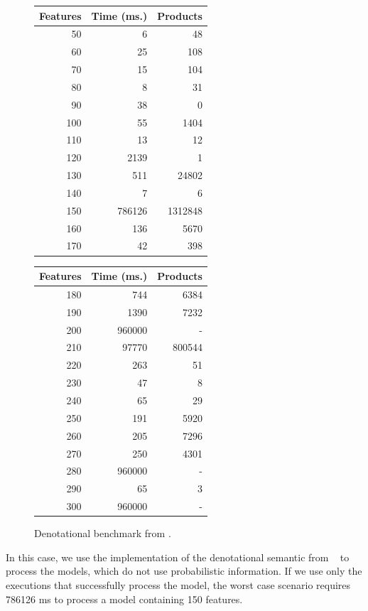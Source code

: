 \begin{figure}[t]
	\centering
	\begin{minipage}{0.4\hsize}
	\begin{tabular}{|rrr|}
			\hline
		Features&       Time (ms.)&    Products\\
			\hline
		50 & 6 & 48 \\
		60 & 25 & 108 \\
		70 & 15 & 104 \\
		80 & 8 & 31 \\
		90 & 38 & 0 \\
		100 & 55 & 1404 \\
		110 & 13 & 12 \\
		120 & 2139 & 1 \\
		130 & 511 & 24802 \\
		140 & 7 & 6 \\
		150 & 786126 & 1312848 \\
		160 & 136 & 5670 \\
		170 & 42 & 398 \\
		\hline
	\end{tabular}
	\end{minipage}
	\begin{minipage}{0.4\hsize}
	\begin{tabular}{|rrr|}
		\hline
		Features&       Time (ms.)&    Products\\
			\hline		
180 & 744 & 6384 \\
190 & 1390 & 7232 \\
200 & 960000 & - \\
210 & 97770 & 800544 \\
220 & 263 & 51 \\
230 & 47 & 8 \\
240 & 65 & 29 \\
250 & 191 & 5920 \\
260 & 205 & 7296 \\
270 & 250 & 4301 \\
280 & 960000 & - \\
290 & 65 & 3 \\
300 & 960000 & - \\
		\hline
	\end{tabular}
	\end{minipage}
	\caption{Denotational benchmark from \cite{acl13}.\label{figure:tool:den:benchmark}}
\end{figure}

In this case, we use the implementation of the denotational semantic from 
\fodaPA~\cite{acl13} to process the models, which do not use probabilistic 
information. If we use only the executions that successfully process the model,
the worst case scenario requires 786126 ms to process a model containing 150 
features.

